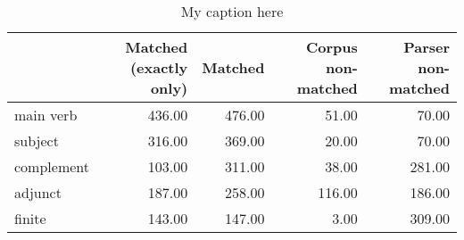 \begin{table}[!ht]
\centering
\begin{tabular}{lrrrr}
\toprule
{} &  Matched (exactly only) &  Matched &  Corpus non-matched &  Parser non-matched \\
\midrule
main verb  &                  436.00 &   476.00 &               51.00 &               70.00 \\
subject    &                  316.00 &   369.00 &               20.00 &               70.00 \\
complement &                  103.00 &   311.00 &               38.00 &              281.00 \\
adjunct    &                  187.00 &   258.00 &              116.00 &              186.00 \\
finite     &                  143.00 &   147.00 &                3.00 &              309.00 \\
\bottomrule
\end{tabular}
\caption{My caption here}
\label{tab:unit-elements-mood-data}
\end{table}